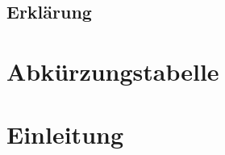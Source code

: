 \documentclass[12pt, a4paper]{scrreprt}
\newcommand\blankpage{%
		\null
		\thispagestyle{empty}%
		\addtocounter{page}{-1}%
		\newpage}
\begin{document}
	
	
	\thispagestyle{empty}
	\section*{Erklärung}
	
	\thispagestyle{empty}
	\newpage
	\begin{abstract}
		
	\end{abstract}
	\afterpage{\blankpage}
	\tableofcontents
	\thispagestyle{empty}
	\listoffigures
	\thispagestyle{empty}
	\chapter*{Abkürzungstabelle}
	\label{abkürzung}
	
	\thispagestyle{empty}
	\chapter{Einleitung}
	\label{einleitung}
	
	\pagestyle{plain}
	\printbibliography
\end{document}
